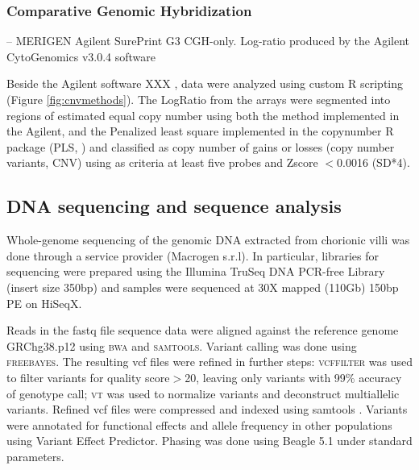 \subsubsection*{Comparative Genomic Hybridization} 
-- MERIGEN Agilent SurePrint G3 CGH-only. Log-ratio produced by the Agilent CytoGenomics v3.0.4 software 

Beside the Agilent software XXX , data were analyzed using custom R scripting (Figure \ref{fig:cnvmethods}). The LogRatio from the arrays were segmented into regions of estimated equal copy number using both the method implemented in the Agilent, and the Penalized least square implemented in the copynumber R package (PLS, \cite{nilsen2012copynumber}) and classified as copy number of gains or losses (copy number variants, CNV) using as criteria at least five probes and Zscore $<$0.0016 (SD*4)\cite{vermeesch2005molecular}. 



\subsection*{DNA sequencing and sequence analysis}
Whole-genome sequencing of the genomic DNA extracted from chorionic villi was done through a service provider (Macrogen s.r.l). In particular, libraries for sequencing were prepared using the Illumina TruSeq DNA PCR-free Library (insert size 350bp) and samples were sequenced at 30X mapped (110Gb) 150bp PE on HiSeqX. 

Reads in the fastq file sequence data were aligned against the reference genome GRChg38.p12 using \textsc{bwa}\cite{li2013aligning} and \textsc{samtools}\cite{li2011statistical}. Variant calling was done using \textsc{freebayes}\cite{garrison2012haplotype}. The resulting vcf files were refined in further steps: \textsc{vcffilter} \cite{vcflib} was used to filter variants for quality score$>$20, leaving only variants with 99\% accuracy of genotype call; \textsc{vt}\cite{tan2015unified} was used to normalize variants and deconstruct multiallelic variants. Refined vcf files were compressed and indexed using samtools \cite{li2011statistical}. Variants were annotated for functional effects and allele frequency in other populations using Variant Effect Predictor\cite{mclaren2016ensembl}. Phasing was done using Beagle 5.1\cite{browning2018one} under standard parameters.  


